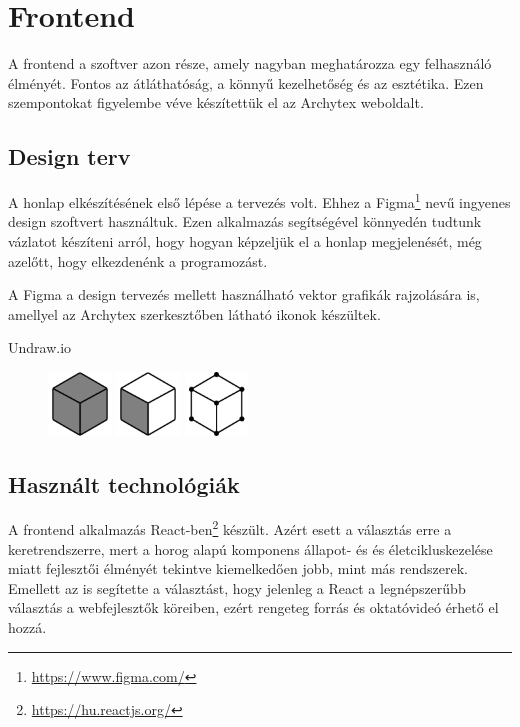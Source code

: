 \section{Frontend}

A frontend a szoftver azon része, amely nagyban meghatározza egy felhasználó élményét. Fontos az átláthatóság, a könnyű kezelhetőség és az esztétika. Ezen szempontokat figyelembe véve készítettük el az Archytex weboldalt.

\subsection{Design terv}
A honlap elkészítésének első lépése a tervezés volt. Ehhez a Figma\footnote{\url{https://www.figma.com/}} nevű ingyenes design szoftvert használtuk. Ezen alkalmazás segítségével könnyedén tudtunk vázlatot készíteni arról, hogy hogyan képzeljük el a honlap megjelenését, még azelőtt, hogy elkezdenénk a programozást.

A Figma a design tervezés mellett használható vektor grafikák rajzolására is, amellyel az Archytex szerkesztőben látható ikonok készültek.

Undraw.io

\begin{figure}
  \centering
  \includegraphics[width=0.15\textwidth]{parts/developer-documentation/frontend/images/meshSelectMode.png}
  \includegraphics[width=0.15\textwidth]{parts/developer-documentation/frontend/images/faceSelectMode.png}
  \includegraphics[width=0.15\textwidth]{parts/developer-documentation/frontend/images/vertexSelectMode.png}
\end{figure}

\subsection{Használt technológiák}
A frontend alkalmazás React-ben\footnote{\url{https://hu.reactjs.org/}} készült. Azért esett a választás erre a keretrendszerre, mert a horog alapú komponens állapot- és és életcikluskezelése miatt fejlesztői élményét tekintve kiemelkedően jobb, mint más rendszerek. Emellett az is segítette a választást, hogy jelenleg a React a legnépszerűbb választás a webfejlesztők köreiben\cite{most-used-web-frameworks}, ezért rengeteg forrás és oktatóvideó érhető el hozzá.

